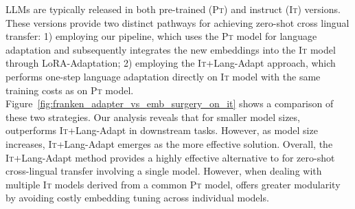 LLMs are typically released in both pre-trained (\textsc{Pt}) and instruct (\textsc{It}) versions. These versions provide two distinct pathways for achieving zero-shot cross lingual transfer: 1) employing our \ouradapter pipeline, which uses the \textsc{Pt} model for language adaptation and subsequently integrates the new embeddings into the \textsc{It} model through LoRA-Adaptation; 2) employing the \textsc{It}+Lang-Adapt approach, which performs one-step language adaptation directly on \textsc{It} model with the same training costs as on \textsc{Pt} model. Figure~\ref{fig:franken_adapter_vs_emb_surgery_on_it} shows a comparison of these two strategies. Our analysis reveals that for smaller model sizes, \ouradapter outperforms \textsc{It}+Lang-Adapt in downstream tasks. However, as model size increases, \textsc{It}+Lang-Adapt emerges as the more effective solution. 
Overall, the \textsc{It}+Lang-Adapt method provides a highly effective alternative to \ouradapter for zero-shot cross-lingual transfer involving a single model. However, when dealing with multiple \textsc{It} models derived from a common \textsc{Pt} model, \ouradapter offers greater modularity by avoiding costly embedding tuning across individual models.
